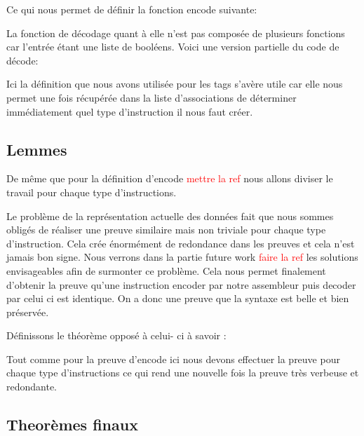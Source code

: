 \documentclass {article}
\newcommand{\codefrom}[3]
           {}
\theoremstyle{definition}
\theoremstyle{remark}
\newcommand{\todo}[1]{\textcolor{red}{#1}}
\begin{document}
\codefrom{src}{encode}{encode_t_n}

Ce qui nous permet de définir la fonction encode suivante:

\codefrom{src}{encode}{encode}

La fonction de décodage quant à elle n'est pas composée de plusieurs fonctions car l'entrée
étant une liste de booléens.
Voici une version partielle du code de décode:

\codefrom{src}{encode}{decode}

Ici la définition que nous avons utilisée pour les tags s'avère utile car elle nous permet
une fois récupérée dans la liste d'associations de déterminer immédiatement quel type
d'instruction il nous faut créer.





\subsection{Lemmes}
\label{LemmesEncode}
De même que pour la définition d'encode \todo{mettre la ref} nous allons diviser le travail pour chaque
type d'instructions.

\codefrom{src}{encodeProof}{encode_decode_t_n}

Le problème de la représentation actuelle des données fait que nous sommes obligés de réaliser une preuve
similaire mais non triviale pour chaque type d'instruction. Cela crée énormément de redondance dans les preuves
et cela n'est jamais bon signe. Nous verrons dans la partie future work \todo{faire la ref} les solutions envisageables afin
de surmonter ce problème.
Cela nous permet finalement d'obtenir la preuve qu'une instruction encoder par notre assembleur puis decoder par celui
ci est identique. On a donc une preuve que la syntaxe est belle et bien préservée.

Définissons le théorème opposé à celui- ci à savoir :

\codefrom{src}{encodeProof}{decode_encode}

Tout comme pour la preuve d'encode ici nous devons effectuer la preuve pour chaque type d'instructions
ce qui rend une nouvelle fois la preuve très verbeuse et redondante. 




\subsection{Theorèmes finaux}
\end{document}
